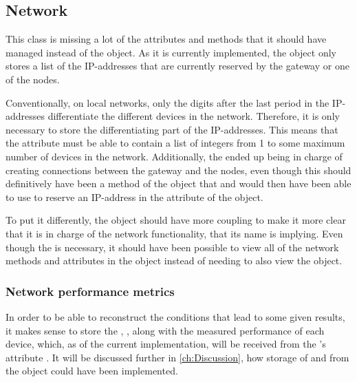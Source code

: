 \subsection{Network}\label{sec:Class_diagram_Network}
This class is missing a lot of the attributes and methods that it should have managed instead of the  object. As it is currently implemented, the  object only stores a list of the IP-addresses that are currently reserved by the gateway or one of the nodes.\bigbreak

\noindent Conventionally, on local networks, only the digits after the last period in the IP-addresses differentiate the different devices in the network. Therefore, it is only necessary to store the differentiating part of the IP-addresses. This means that the attribute  must be able to contain a list of integers from 1 to some maximum number of devices in the network. Additionally, the  ended up being in charge of creating connections between the gateway and the nodes, even though this should definitively have been a method of the  object that  and  would then have been able to use to reserve an IP-address in the  attribute of the  object.\newline

\noindent To put it differently, the  object should have more coupling to make it more clear that it is in charge of the network functionality, that its name is implying. Even though the  is necessary, it should have been possible to view all of the network methods and attributes in the  object instead of needing to also view the  object.

\subsubsection{Network performance metrics}
In order to be able to reconstruct the conditions that lead to some given results, it makes sense to store the , , along with the measured performance of each device, which, as of the current implementation, will be received from the 's attribute . It will be discussed further in \autoref{ch:Discussion}, how storage of  and  from the  object could have been implemented.

